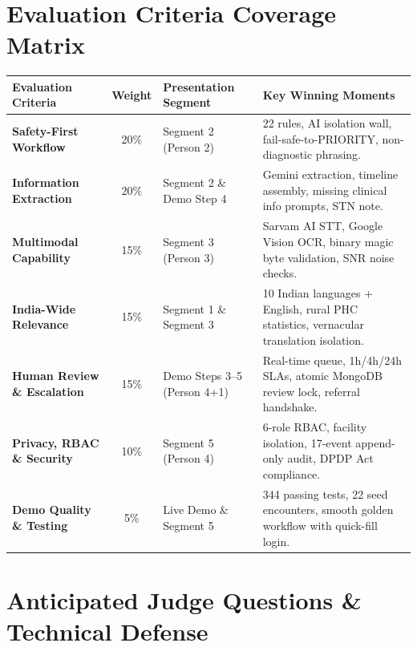 \documentclass[11pt,a4paper]{article}
\begin{document}
\section*{Evaluation Criteria Coverage Matrix}

\begin{table}[htbp]
  \centering
  \small
  \begin{tabularx}{\textwidth}{p{3.2cm}cp{3.8cm}X}
    \toprule
    \textbf{Evaluation Criteria} & \textbf{Weight} & \textbf{Presentation Segment} & \textbf{Key Winning Moments} \\
    \midrule
    \textbf{Safety-First Workflow} & 20\% & Segment 2 (Person 2) & 22 rules, AI isolation wall, fail-safe-to-PRIORITY, non-diagnostic phrasing. \\
    \addlinespace
    \textbf{Information Extraction} & 20\% & Segment 2 \& Demo Step 4 & Gemini extraction, timeline assembly, missing clinical info prompts, STN note. \\
    \addlinespace
    \textbf{Multimodal Capability} & 15\% & Segment 3 (Person 3) & Sarvam AI STT, Google Vision OCR, binary magic byte validation, SNR noise checks. \\
    \addlinespace
    \textbf{India-Wide Relevance} & 15\% & Segment 1 \& Segment 3 & 10 Indian languages + English, rural PHC statistics, vernacular translation isolation. \\
    \addlinespace
    \textbf{Human Review \& Escalation} & 15\% & Demo Steps 3--5 (Person 4+1) & Real-time queue, 1h/4h/24h SLAs, atomic MongoDB review lock, referral handshake. \\
    \addlinespace
    \textbf{Privacy, RBAC \& Security} & 10\% & Segment 5 (Person 4) & 6-role RBAC, facility isolation, 17-event append-only audit, DPDP Act compliance. \\
    \addlinespace
    \textbf{Demo Quality \& Testing} & 5\% & Live Demo \& Segment 5 & 344 passing tests, 22 seed encounters, smooth golden workflow with quick-fill login. \\
    \bottomrule
  \end{tabularx}
\end{table}

\vspace{4mm}

\section*{Anticipated Judge Questions \& Technical Defense}
\end{document}
